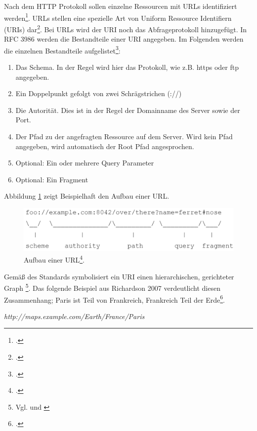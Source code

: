 Nach dem HTTP Protokoll sollen einzelne Ressourcen mit URLs identifiziert werden\footcite[Vgl. ][S. 18]{fielding_hypertext_1999}. URLs stellen eine spezielle Art von Uniform Ressource Identifiern (URIs) dar\footcite[Vgl. ]{berners-lee_uniform_2005-1}. Bei URLs wird der URI noch das Abfrageprotokoll hinzugefügt. In RFC 3986 werden die Bestandteile einer URI angegeben. Im Folgenden werden die einzelnen Bestandteile aufgelistet\footcite[Vgl. ][S. 6ff]{berners-lee_uniform_2005-1}:

\begin{enumerate}
    \item Das Schema. In der Regel wird hier das Protokoll, wie z.B. https oder ftp angegeben.
    \item Ein Doppelpunkt gefolgt von zwei Schrägstrichen (://)
    \item Die Autorität. Dies ist in der Regel der Domainname des Server sowie der Port.
    \item Der Pfad zu der angefragten Ressource auf dem Server. Wird kein Pfad angegeben, wird automatisch der Root Pfad angesprochen.
    \item Optional: Ein oder mehrere Query Parameter
    \item Optional: Ein Fragment
\end{enumerate}

Abbildung \ref{abb:AufbauURL} zeigt Beispielhaft den Aufbau einer URL. 

\begin{figure}[htb]
\centering
\includegraphics[width=12cm]{graphics/aufbau-url.png}
\caption[aufbau-einer-url]{Aufbau einer URL\footcite[Vgl. ][S. 16]{berners-lee_uniform_2005-1}.}
\label{abb:AufbauURL}
\end{figure}

Gemäß des Standards symbolisiert ein URI einen hierarchischen, gerichteter Graph \footnote{Vgl. \cite[S. 118]{richardson_restful_2007} und \cite[S. 175]{palma_semantic_2017}}. Das folgende Beispiel aus Richardson 2007 verdeutlicht diesen Zusammenhang; Paris ist Teil von Frankreich, Frankreich Teil der Erde\footcite[Vgl. ][S. 118]{richardson_restful_2007}.

\emph{http://maps.example.com/Earth/France/Paris}

